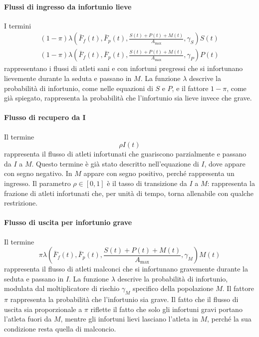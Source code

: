 \paragraph{Flussi di ingresso da infortunio lieve}
I termini
\begin{gather*}
    (1 - \pi) \lambda\left(\bar{F}_f(t), \bar{F}_p(t), \frac{S(t) + P(t) + M(t)}{A_{\max}}, \gamma_S\right) S(t) \\
    (1 - \pi) \lambda\left(\bar{F}_f(t), \bar{F}_p(t), \frac{S(t) + P(t) + M(t)}{A_{\max}}, \gamma_P\right) P(t)
\end{gather*}
rappresentano i flussi di atleti sani e con infortuni pregressi che si infortunano lievemente durante la seduta e passano in $M$. La funzione $\lambda$ descrive la probabilità di infortunio, come nelle equazioni di $S$ e $P$, e il fattore $1 - \pi$, come già spiegato, rappresenta la probabilità che l'infortunio sia lieve invece che grave.

\paragraph{Flusso di recupero da I}
Il termine
\[
    \rho I(t)
\]
rappresenta il flusso di atleti infortunati che guariscono parzialmente e passano da $I$ a $M$. Questo termine è già stato descritto nell'equazione di $I$, dove appare con segno negativo. In $M$ appare con segno positivo, perché rappresenta un ingresso. Il parametro $\rho \in [0,1]$ è il tasso di transizione da $I$ a $M$: rappresenta la frazione di atleti infortunati che, per unità di tempo, torna allenabile con qualche restrizione.

\paragraph{Flusso di uscita per infortunio grave}
Il termine
\[
    \pi \lambda\left(\bar{F}_f(t), \bar{F}_p(t), \frac{S(t) + P(t) + M(t)}{A_{\max}}, \gamma_M\right) M(t)
\]
rappresenta il flusso di atleti malconci che si infortunano gravemente durante la seduta e passano in $I$. La funzione $\lambda$ descrive la probabilità di infortunio, modulata dal moltiplicatore di rischio $\gamma_M$ specifico della popolazione $M$. Il fattore $\pi$ rappresenta la probabilità che l'infortunio sia grave. Il fatto che il flusso di uscita sia proporzionale a $\pi$ riflette il fatto che solo gli infortuni gravi portano l'atleta fuori da $M$, mentre gli infortuni lievi lasciano l'atleta in $M$, perché la sua condizione resta quella di malconcio. \par

